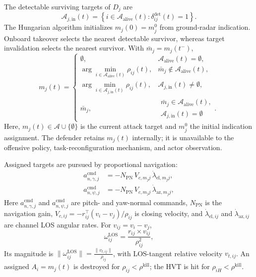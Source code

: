 \documentclass[unbranded]{cja}
\begin{document}
The detectable surviving targets of $D_j$ are
\begin{equation}
\mathcal A_{j,\mathrm{in}}(t)
=
\left\{
i\in\mathcal A_{\mathrm{alive}}(t):
\delta_{ij}^{\mathrm{det}}(t)=1
\right\}.
\label{eq:in-detect-set}
\end{equation}
The Hungarian algorithm initializes $m_j(0)=m_j^0$ from ground-radar indication. Onboard takeover selects the nearest detectable survivor, whereas target invalidation selects the nearest survivor. With $\bar m_j=m_j(t^-)$,
\begin{equation}
m_j(t)=
\begin{cases}
\emptyset,
& \mathcal A_{\mathrm{alive}}(t)=\emptyset,\\[1mm]
\displaystyle \arg\min_{i\in \mathcal A_{\mathrm{alive}}(t)}
\rho_{ij}(t),
& \bar m_j\notin \mathcal A_{\mathrm{alive}}(t),\\[3mm]
\displaystyle \arg\min_{i\in \mathcal A_{j,\mathrm{in}}(t)}
\rho_{ij}(t),
& \mathcal A_{j,\mathrm{in}}(t)\neq\emptyset,\\[3mm]
\bar m_j,
& \substack{\bar m_j\in \mathcal A_{\mathrm{alive}}(t),\\
\mathcal A_{j,\mathrm{in}}(t)=\emptyset}.
\end{cases}
\label{eq:fov-lock-rule}
\end{equation}
Here, $m_j(t)\in\mathcal A\cup\{\emptyset\}$ is the current attack target and $m_j^0$ the initial indication assignment. The defender retains $m_j(t)$ internally; it is unavailable to the offensive policy, task-reconfiguration mechanism, and actor observation.

Assigned targets are pursued by proportional navigation:
\begin{equation}
\begin{aligned}
a_{n,\gamma,j}^{\mathrm{cmd}}
&=-N_{\mathrm{PN}}\,V_{c,m_j j}\,\dot\lambda_{\mathrm{el},m_j j},\\
a_{n,\psi,j}^{\mathrm{cmd}}
&=-N_{\mathrm{PN}}\,V_{c,m_j j}\,\dot\lambda_{\mathrm{az},m_j j},
\end{aligned}
\label{eq:def-guid-pn}
\end{equation}
Here $a_{n,\gamma,j}^{\mathrm{cmd}}$ and $a_{n,\psi,j}^{\mathrm{cmd}}$ are pitch- and yaw-normal commands, $N_{\mathrm{PN}}$ is the navigation gain, $V_{c,ij}=-r_{ij}^\top(v_i-v_j)/\rho_{ij}$ is closing velocity, and $\dot\lambda_{\mathrm{el},ij}$ and $\dot\lambda_{\mathrm{az},ij}$ are channel LOS angular rates. For $v_{ij}=v_i-v_j$,
\begin{equation}
\omega_{ij}^{\mathrm{LOS}} = \frac{r_{ij}\times v_{ij}}{\rho_{ij}^2},
\label{eq:omega_ij_def}
\end{equation}
Its magnitude is $\|\omega_{ij}^{\mathrm{LOS}}\| = \frac{\|v_{t,ij}\|}{\rho_{ij}}$, with LOS-tangent relative velocity $v_{t,ij}$. An assigned $A_i=m_j(t)$ is destroyed for $\rho_{ij}<\rho^{\mathrm{kill}}$; the HVT is hit for $\rho_{iH}<\rho^{\mathrm{kill}}$.
\end{document}
